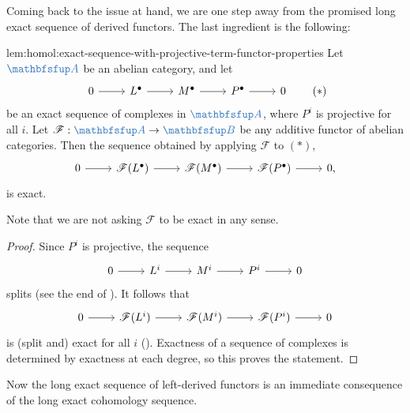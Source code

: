 Coming back to the issue at hand, we are one step away from the
promised long exact sequence of derived functors. The last ingredient
is the following:

\begin{lem}{}{lem:homol:exact-sequence-with-projective-term-functor-properties}
  Let $\categ{A}$ be an abelian category, and let
  \[\begin{tikzcd}
      0 \arrow[r] & L^\bullet \arrow[r] & M^\bullet \arrow[r] &
      P^\bullet \arrow[r] & 0
    \end{tikzcd} \tag{$*$}\] be an exact sequence of complexes in
  $\categ{A}$, where $P^i$ is projective for all $i$. Let
  $\mathscr{F} : \categ{A} \to \categ{B}$ be any additive functor of
  abelian categories. Then the sequence obtained by applying
  $\mathscr{F}$ to $(*)$,
  \[\begin{tikzcd}
      0 \arrow[r] & \mathscr{F}(L^\bullet) \arrow[r] &
      \mathscr{F}(M^\bullet) \arrow[r] & \mathscr{F}(P^\bullet)
      \arrow[r] & 0,
    \end{tikzcd}\] is exact.
\end{lem}

Note that we are not asking $\mathscr{F}$ to be exact in any sense.

\begin{proof}
  Since $P^i$ is projective, the sequence
  \[\begin{tikzcd}
      0 \arrow[r] & L^i \arrow[r] & M^i \arrow[r] & P^i \arrow[r] & 0
    \end{tikzcd}\] splits (see the end of
  ). It follows that
  \[\begin{tikzcd}
      0 \arrow[r] & \mathscr{F}(L^i) \arrow[r] & \mathscr{F}(M^i)
      \arrow[r] & \mathscr{F}(P^i) \arrow[r] & 0
    \end{tikzcd}\] is (split and) exact for all $i$
  (). Exactness
  of a sequence of complexes is determined by exactness at each
  degree, so this proves the statement.
\end{proof}

Now the long exact sequence of left-derived functors is an immediate
consequence of the long exact cohomology sequence.

